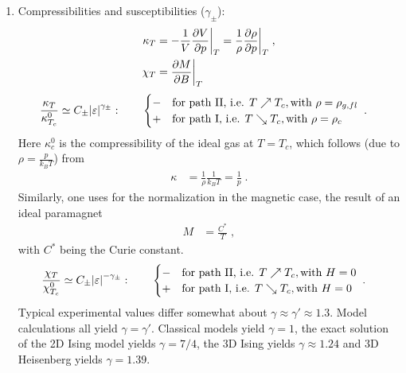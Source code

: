 \begin{enumerate}
\item Compressibilities and susceptibilities ($\gamma_{\pm}$):
%
\begin{align*}
\kappa_{T} &= -\frac{1}{V}\frac{\partial V}{\partial p}\bigg|_{T} = \frac{1}{\rho} \frac{\partial \rho}{\partial p}\bigg|_{T}\;,\\
\chi_{T} &= \frac{\partial M}{\partial B}\bigg|_{T}
\end{align*}
%
\begin{align}\label{eq:}
\frac{\kappa_{T}}{\kappa^{0}_{T_{c}}}&\simeq C_{\pm} \abs{\varepsilon}^{\gamma_{\pm}}
:\qquad \begin{cases}
- &\text{for path II, i.e. } T \nearrow 	T_{c}, \text{with } \rho=\rho_{g,fl}\\
 + &\text{for path I, i.e. } T \searrow 	T_{c}, \text{with } \rho=\rho_{c}
\end{cases}\;.
\end{align}
%
Here $\kappa^{0}_{c}$ is the compressibility of the ideal gas at $T=T_{c}$, which follows (due to $\rho=\frac{p}{k_{B}T}$) from
%
\begin{align*}
\kappa &= \frac{1}{\rho} \frac{1}{k_{B}T} = \frac{1}{p}\;.
\end{align*}
%
Similarly, one uses for the normalization in the magnetic case, the result of an ideal paramagnet
%
\begin{align*}
M &=\frac{C^{*}}{T}\;,
\end{align*}
%
with $C^{*}$ being the Curie constant.
\begin{align}\label{eq:}
\frac{\chi_{T}}{\chi^{0}_{T_{c}}}&\simeq C_{\pm} \abs{\varepsilon}^{-\gamma_{\pm}}
:\qquad \begin{cases}
-&\text{for path II, i.e. } T \nearrow 	T_{c}, \text{with } H=0\\
 +&\text{for path I, i.e. } T \searrow 	T_{c}, \text{with } H=0
\end{cases}\;.
\end{align}
%
Typical experimental values differ somewhat about $\gamma\approx \gamma' \approx 1.3$.
Model calculations all yield $\gamma=\gamma'$. Classical models yield $\gamma=1$, the exact solution of the 2D Ising model yields
$\gamma =7/4$, the 3D Ising yields $\gamma\approx 1.24$ and 3D Heisenberg yields $\gamma=1.39$.


\end{enumerate}
